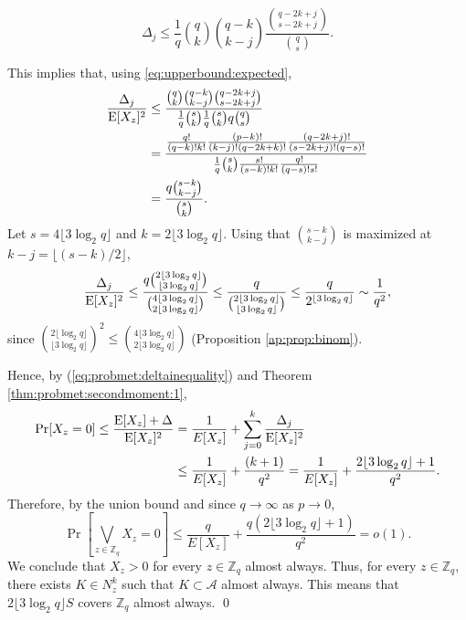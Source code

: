 \[\Delta_j \leq \frac{1}{q}\binom{q}{k}\binom{q - k}{k - j} \frac{\binom{q - 2k + j}{s - 2k + j}}{\binom{q}{s}}.\]
\par This implies that, using \ref{eq:upperbound:expected},
\begin{align*}
    \frac{\Delta_j}{\mathrm{E}[X_z]^2} &\leq \frac{\binom{q}{k} \binom{q - k}{k - j}\binom{q - 2k + j}{s - 2k + j}}{\frac{1}{q} \binom{s}{k}\frac{1}{q} \binom{s}{k}q\binom{q}{s}} \\
    &= \frac{\frac{q!}{(q - k)!k!}\frac{(p - k)!}{(k - j)!(q - 2k + k)!}\frac{(q - 2k + j)!}{(s - 2k + j)!(q - s)!}}{\frac{1}{q}\binom{s}{k}\frac{s!}{(s - k)!k!}\frac{q!}{(q - s)!s!}} \\
    &= \frac{q\binom{s - k}{k - j}}{\binom{s}{k}}.
\end{align*}
Let $s = 4\lfloor 3 \log_2 q \rfloor$ and $k = 2\lfloor 3 \log_2 q \rfloor$. Using that $\binom{s - k}{k - j}$ is maximized at $k - j = \lfloor (s - k) / 2\rfloor$,
\begin{align*}
\frac{\Delta_j}{\mathrm{E}[X_z]^2} \leq \frac{q \binom{2\lfloor 3 \log_2 q\rfloor}{\lfloor 3 \log_2 q \rfloor}}{\binom{4\lfloor 3\log_2 q \rfloor}{2\lfloor 3\log_2 q \rfloor}} \leq \frac{q}{\binom{2\lfloor 3 \log_2 q \rfloor }{ \lfloor 3 \log_2 q \rfloor}} \leq \frac{q}{2^{\lfloor 3 \log_2 q \rfloor}} \sim \frac{1}{q^2},
\end{align*}
since \(\binom{2\lfloor \log_2 q \rfloor}{\lfloor 3 \log_2 q \rfloor}^2 \leq \binom{4\lfloor 3 \log_2 q \rfloor }{2\lfloor 3 \log_2 q \rfloor}\) (Proposition \ref{ap:prop:binom}).   \par
Hence, by (\ref{eq:probmet:deltainequality}) and Theorem \ref{thm:probmet:secondmoment:1},
\begin{align*}
\mathrm{Pr}[X_z = 0] \leq \frac{\mathrm{E}[X_z] + \Delta}{\mathrm{E}[X_z]^2} &= \frac{1}{E[X_z]} + \sum_{j = 0}^k \frac{\Delta_j}{\mathrm{E}[X_z]^2} \\
&\leq \frac{1}{E[X_z]} + \frac{(k + 1)}{q^2} = \frac{1}{E[X_z]} + \frac{2\lfloor 3 \log_2 q\rfloor + 1}{q^2}.
\end{align*}
Therefore, by the union bound and since $q \to \infty$ as $p \to 0$,
\[\Pr\left[\bigvee_{z \in \mathbb{Z}_q} X_z = 0\right] \leq \frac{q}{E[X_z]} + \frac{q(2\lfloor 3 \log_2 q\rfloor + 1)}{q^2} = o(1).\]
We conclude that $X_z > 0$ for every $z \in \mathbb{Z}_q$ almost always. Thus, for every $z \in \mathbb{Z}_q$, there exists $K \in N_z^k$ such that $K \subset \mathcal{A}$ almost always. This means that $2\lfloor 3 \log_2 q\rfloor S$ covers $\mathbb{Z}_q$ almost always. \qed

